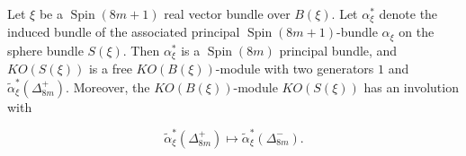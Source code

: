 Let $\xi$ be a $\operatorname{Spin}(8m+1)$ real vector bundle over $B(\xi)$. Let $\alpha^*_{\xi}$ denote the induced bundle of the associated principal $\operatorname{Spin}(8m+1)$-bundle $\alpha_{\xi}$ on the sphere bundle $S(\xi)$. Then $\alpha^*_{\xi}$ is a $\operatorname{Spin}(8m)$ principal bundle, and $KO(S(\xi))$ is a free $KO(B(\xi))$-module with two generators $1$ and $\tilde{\alpha}^*_{\xi}(\Delta^+_{8m})$. Moreover, the $KO(B(\xi))$-module $KO(S(\xi))$ has an involution with

$$
\tilde{\alpha}^*_{\xi}(\Delta^+_{8m}) \mapsto \tilde{\alpha}^*_{\xi}(\Delta^-_{8m}).
$$
